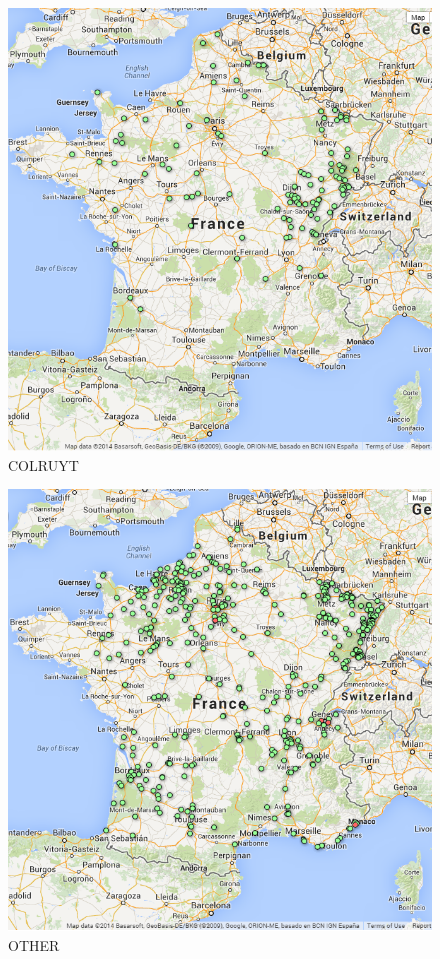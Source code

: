 \documentclass[11pt]{article}
\begin{document}
\begin{figure}[!h]
    \caption{COLRUYT}
	\centering
		\includegraphics[width=16cm]{images/COLRUYT.png}
\end{figure}

\begin{figure}[!h]
    \caption{OTHER}
	\centering
		\includegraphics[width=16cm]{images/AUTRE.png}
\end{figure}
\end{document}
